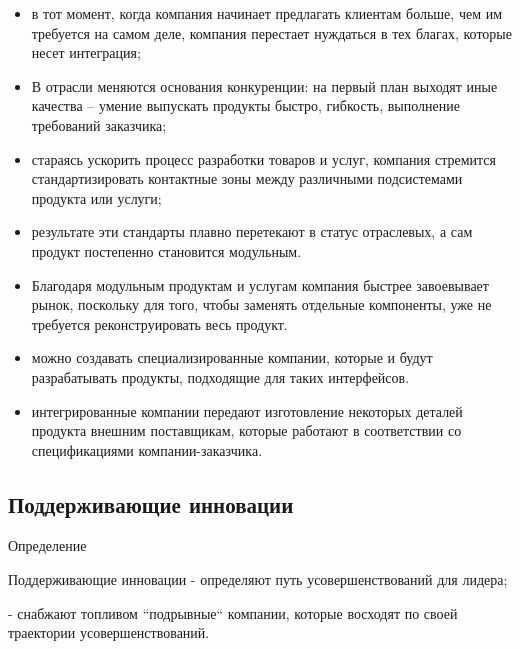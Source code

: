 \documentclass[_Venture_p3.tex]{subfiles}
\begin{document}
\begin{frame}
\begin{itemize}
	\small
	\item в тот момент, когда компания начинает предлагать клиентам больше, чем им требуется на самом деле, компания перестает нуждаться в тех благах, которые несет интеграция;
	\item В отрасли меняются основания конкуренции: на первый план выходят иные качества – умение выпускать продукты быстро, гибкость, выполнение требований заказчика; 
	\item стараясь ускорить процесс разработки товаров и услуг, компания стремится стандартизировать контактные зоны между различными подсистемами продукта или услуги; 
	\item результате эти стандарты плавно перетекают в статус отраслевых, а сам продукт постепенно становится модульным. 
\end{itemize}
\end{frame}

\begin{frame}
\begin{itemize}
	\small
	\item Благодаря модульным продуктам и услугам компания быстрее завоевывает рынок, поскольку для того, чтобы заменять отдельные компоненты, уже не требуется реконструировать весь продукт. 
	\item можно создавать специализированные компании, которые и будут разрабатывать продукты, подходящие для таких интерфейсов. 
	\item интегрированные компании передают изготовление некоторых деталей продукта внешним поставщикам, которые работают в соответствии со спецификациями компании-заказчика.
\end{itemize}
\end{frame}

\subsection{Поддерживающие инновации}
\begin{frame}{Определение}
\begin{block}{Поддерживающие инновации}
\quad
- определяют путь усовершенствований для лидера;
 
- снабжают топливом ``подрывные`` компании, которые восходят по своей траектории усовершенствований.
\end{block}
\end{frame}
\end{document}

